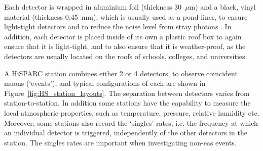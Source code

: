 Each detector is wrapped in aluminium foil (thickness 30~$\mu$m) and a black, vinyl material (thickness 0.45~mm), which is usually used as a pond liner, to ensure light-tight detectors and to reduce the noise level from stray photons \citep{van_dam_hisparc_2020}. In addition, each detector is placed inside of its own a plastic roof box to again ensure that it is light-tight, and to also ensure that it is weather-proof, as the detectors are usually located on the roofs of schools, colleges, and universities.

A HiSPARC station combines either 2 or 4 detectors, to observe coincident muons (`events'), and typical configurations of each are shown in Figure~\ref{fig:HS_station_layouts}. The separation between detectors varies from station-to-station. In addition some stations have the capability to measure the local atmospheric properties, such as temperature, pressure, relative humidity etc. Moreover, some stations also record the `singles' rates, i.e. the frequency at which an individual detector is triggered, independently of the other detectors in the station. The singles rates are important when investigating non-\gls{eas} events.


